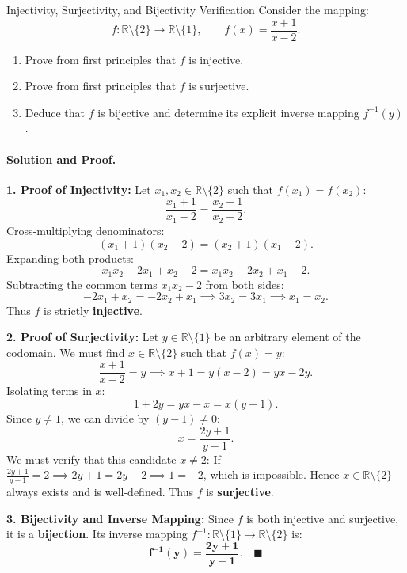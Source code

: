 \begin{workedexample}{Injectivity, Surjectivity, and Bijectivity Verification}
Consider the mapping:
\[
f: \mathbb{R} \setminus \{2\} \longrightarrow \mathbb{R} \setminus \{1\}, \qquad f(x) = \frac{x + 1}{x - 2}.
\]
\begin{enumerate}[leftmargin=1.4em,itemsep=2pt]
  \item Prove from first principles that $f$ is injective.
  \item Prove from first principles that $f$ is surjective.
  \item Deduce that $f$ is bijective and determine its explicit inverse mapping $f^{-1}(y)$.
\end{enumerate}

\paragraph{Solution and Proof.}
\textbf{1. Proof of Injectivity:}
Let $x_1, x_2 \in \mathbb{R} \setminus \{2\}$ such that $f(x_1) = f(x_2)$:
\[
\frac{x_1 + 1}{x_1 - 2} = \frac{x_2 + 1}{x_2 - 2}.
\]
Cross-multiplying denominators:
\[
(x_1 + 1)(x_2 - 2) = (x_2 + 1)(x_1 - 2).
\]
Expanding both products:
\[
x_1 x_2 - 2 x_1 + x_2 - 2 = x_1 x_2 - 2 x_2 + x_1 - 2.
\]
Subtracting the common terms $x_1 x_2 - 2$ from both sides:
\[
-2 x_1 + x_2 = -2 x_2 + x_1 \implies 3 x_2 = 3 x_1 \implies x_1 = x_2.
\]
Thus $f$ is strictly \textbf{injective}.

\textbf{2. Proof of Surjectivity:}
Let $y \in \mathbb{R} \setminus \{1\}$ be an arbitrary element of the codomain. We must find $x \in \mathbb{R} \setminus \{2\}$ such that $f(x) = y$:
\[
\frac{x + 1}{x - 2} = y \implies x + 1 = y(x - 2) = y x - 2y.
\]
Isolating terms in $x$:
\[
1 + 2y = y x - x = x(y - 1).
\]
Since $y \neq 1$, we can divide by $(y - 1) \neq 0$:
\[
x = \frac{2y + 1}{y - 1}.
\]
We must verify that this candidate $x \neq 2$:
If $\frac{2y+1}{y-1} = 2 \implies 2y + 1 = 2y - 2 \implies 1 = -2$, which is impossible.
Hence $x \in \mathbb{R} \setminus \{2\}$ always exists and is well-defined.
Thus $f$ is \textbf{surjective}.

\textbf{3. Bijectivity and Inverse Mapping:}
Since $f$ is both injective and surjective, it is a \textbf{bijection}.
Its inverse mapping $f^{-1}: \mathbb{R} \setminus \{1\} \longrightarrow \mathbb{R} \setminus \{2\}$ is:
\[
\mathbf{f^{-1}(y) = \frac{2y + 1}{y - 1}}. \quad \blacksquare
\]
\end{workedexample}


